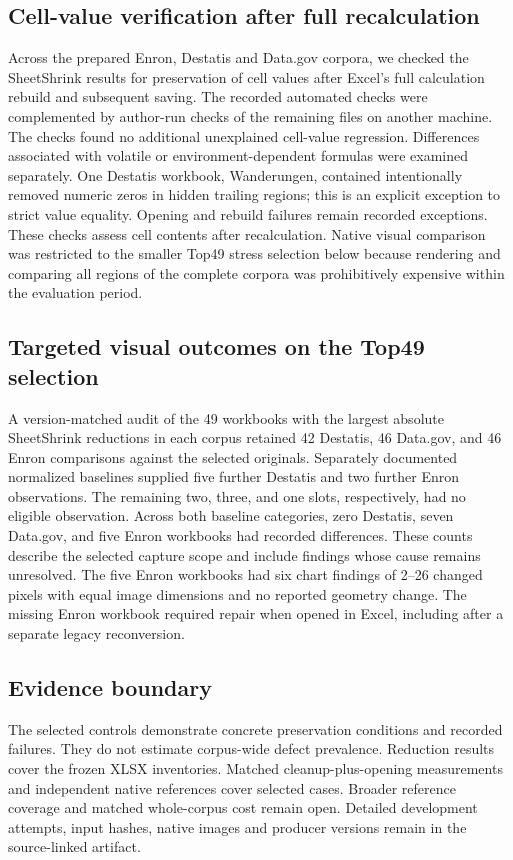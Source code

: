 \subsection{Cell-value verification after full recalculation}
Across the prepared Enron, Destatis and Data.gov corpora, we checked the
SheetShrink results for preservation of cell values after Excel's full
calculation rebuild and subsequent saving. The recorded automated checks were
complemented by author-run checks of the remaining files on another machine.
The checks found no additional unexplained cell-value regression. Differences
associated with volatile or environment-dependent formulas were examined
separately. One Destatis workbook, Wanderungen, contained intentionally removed
numeric zeros in hidden trailing regions; this is an explicit exception to
strict value equality. Opening and rebuild failures remain recorded exceptions.
These checks assess cell contents after recalculation. Native visual comparison
was restricted to the smaller Top49 stress selection below because rendering
and comparing all regions of the complete corpora was prohibitively expensive
within the evaluation period.

\subsection{Targeted visual outcomes on the Top49 selection}
A version-matched audit of the 49 workbooks with the largest absolute
SheetShrink reductions in each corpus retained 42 Destatis, 46 Data.gov,
and 46 Enron comparisons against the selected originals. Separately
documented normalized baselines supplied five further Destatis and two
further Enron observations. The remaining two, three, and one slots,
respectively, had no eligible observation. Across both baseline categories,
zero Destatis, seven Data.gov, and five Enron workbooks had recorded
differences. These counts describe the selected capture scope and include
findings whose cause remains unresolved. The five Enron workbooks had six
chart findings of 2--26 changed pixels with equal image dimensions and no
reported geometry change. The missing Enron workbook required repair
when opened in Excel, including after a separate legacy reconversion.

\subsection{Evidence boundary}
The selected controls demonstrate concrete preservation conditions and recorded
failures. They do not estimate corpus-wide defect prevalence. Reduction results
cover the frozen XLSX inventories. Matched cleanup-plus-opening measurements and
independent native references cover selected cases. Broader reference coverage
and matched whole-corpus cost remain open. Detailed development attempts, input hashes, native images and
producer versions remain in the source-linked artifact.
